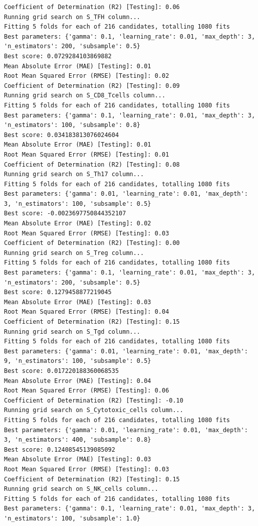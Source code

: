 \documentclass[
  letterpaper,
  DIV=11,
  numbers=noendperiod]{scrartcl}
\begin{document}
\begin{verbatim}
Coefficient of Determination (R2) [Testing]: 0.06
Running grid search on S_TFH column...
Fitting 5 folds for each of 216 candidates, totalling 1080 fits
Best parameters: {'gamma': 0.1, 'learning_rate': 0.01, 'max_depth': 3, 'n_estimators': 200, 'subsample': 0.5}
Best score: 0.0729284103869882
Mean Absolute Error (MAE) [Testing]: 0.01
Root Mean Squared Error (RMSE) [Testing]: 0.02
Coefficient of Determination (R2) [Testing]: 0.09
Running grid search on S_CD8_Tcells column...
Fitting 5 folds for each of 216 candidates, totalling 1080 fits
Best parameters: {'gamma': 0.1, 'learning_rate': 0.01, 'max_depth': 3, 'n_estimators': 100, 'subsample': 0.8}
Best score: 0.034183813076024604
Mean Absolute Error (MAE) [Testing]: 0.01
Root Mean Squared Error (RMSE) [Testing]: 0.01
Coefficient of Determination (R2) [Testing]: 0.08
Running grid search on S_Th17 column...
Fitting 5 folds for each of 216 candidates, totalling 1080 fits
Best parameters: {'gamma': 0.01, 'learning_rate': 0.01, 'max_depth': 3, 'n_estimators': 100, 'subsample': 0.5}
Best score: -0.0023697750844352107
Mean Absolute Error (MAE) [Testing]: 0.02
Root Mean Squared Error (RMSE) [Testing]: 0.03
Coefficient of Determination (R2) [Testing]: 0.00
Running grid search on S_Treg column...
Fitting 5 folds for each of 216 candidates, totalling 1080 fits
Best parameters: {'gamma': 0.1, 'learning_rate': 0.01, 'max_depth': 3, 'n_estimators': 200, 'subsample': 0.5}
Best score: 0.1279458877219045
Mean Absolute Error (MAE) [Testing]: 0.03
Root Mean Squared Error (RMSE) [Testing]: 0.04
Coefficient of Determination (R2) [Testing]: 0.15
Running grid search on S_Tgd column...
Fitting 5 folds for each of 216 candidates, totalling 1080 fits
Best parameters: {'gamma': 0.01, 'learning_rate': 0.01, 'max_depth': 9, 'n_estimators': 100, 'subsample': 0.5}
Best score: 0.017220188360068535
Mean Absolute Error (MAE) [Testing]: 0.04
Root Mean Squared Error (RMSE) [Testing]: 0.06
Coefficient of Determination (R2) [Testing]: -0.10
Running grid search on S_Cytotoxic_cells column...
Fitting 5 folds for each of 216 candidates, totalling 1080 fits
Best parameters: {'gamma': 0.01, 'learning_rate': 0.01, 'max_depth': 3, 'n_estimators': 400, 'subsample': 0.8}
Best score: 0.12408545139085092
Mean Absolute Error (MAE) [Testing]: 0.03
Root Mean Squared Error (RMSE) [Testing]: 0.03
Coefficient of Determination (R2) [Testing]: 0.15
Running grid search on S_NK_cells column...
Fitting 5 folds for each of 216 candidates, totalling 1080 fits
Best parameters: {'gamma': 0.1, 'learning_rate': 0.01, 'max_depth': 3, 'n_estimators': 100, 'subsample': 1.0}

\end{verbatim}
\end{document}
